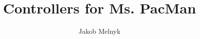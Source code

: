 \documentclass[conference]{IEEEtran}
\begin{document}
\title{\ \\ \LARGE\bf Controllers for Ms. PacMan}

\author{Jakob Melnyk}

\maketitle

%

%





%

%



\end{document}
